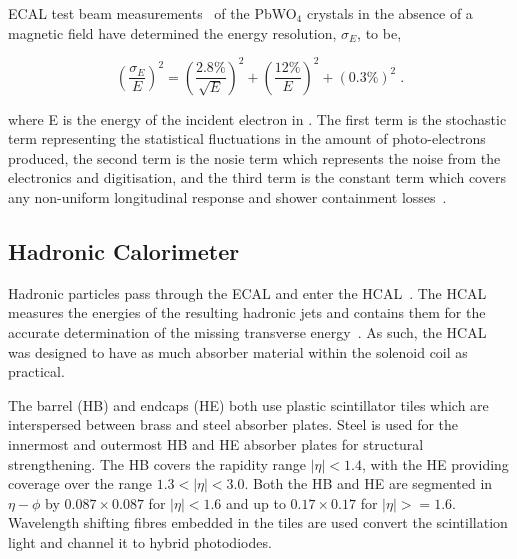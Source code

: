 ECAL test beam measurements~\cite{Adzic:2007mi} of the PbWO$_{4}$ crystals in the absence of a magnetic field have determined the energy resolution, $\sigma_{E}$, to be,

\begin{equation}
(\frac{\sigma_{E}}{E})^{2} = (\frac{2.8\%}{\sqrt{E}})^{2} + (\frac{12\%}{E})^{2} + (0.3\%)^{2} \;.
\label{eq:ecalResolution}
\end{equation}

where E is the energy of the incident electron in \GeV. 
The first term is the stochastic term representing the statistical fluctuations in the amount of photo-electrons produced, the second term is the nosie term which represents the noise from the electronics and digitisation, and the third term is the constant term which covers any non-uniform longitudinal response and shower containment losses~\cite{Adzic:2007mi}.


\subsection{Hadronic Calorimeter}\label{subsec:HCAL}
Hadronic particles pass through the ECAL and enter the HCAL~\cite{HCAL:tdr}.
The HCAL measures the energies of the resulting hadronic jets and contains them for the accurate determination of the missing transverse energy~\cite{HCAL:tdr}.
As such, the HCAL was designed to have as much absorber material within the solenoid coil as practical. 

The barrel (HB) and endcaps (HE) both use plastic scintillator tiles which are interspersed between brass and steel absorber plates.
Steel is used for the innermost and outermost HB and HE absorber plates for structural strengthening.
The HB covers the rapidity range $|\eta| < 1.4$, with the HE providing coverage over the range $1.3 < |\eta| < 3.0$.
Both the HB and HE are segmented in $\eta - \phi$ by $0.087 \times 0.087$ for $| \eta | < 1.6$ and up to $0.17 \times 0.17$ for $| \eta | >= 1.6$.
Wavelength shifting fibres embedded in the tiles are used convert the scintillation light and channel it to hybrid photodiodes.

